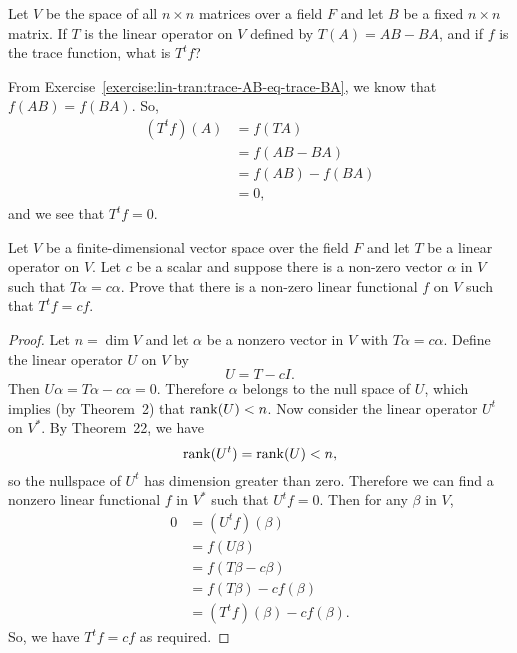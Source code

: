  Let $V$ be the space of all $n\times n$ matrices over a
field $F$ and let $B$ be a fixed $n\times n$ matrix. If $T$ is the
linear operator on $V$ defined by $T(A) = AB - BA$, and if $f$ is the
trace function, what is $T^tf$?
\begin{solution}
  From Exercise~\ref{exercise:lin-tran:trace-AB-eq-trace-BA}, we know
  that $f(AB) = f(BA)$. So,
  \begin{align*}
    (T^tf)(A)
    &= f(TA) \\
    &= f(AB - BA) \\
    &= f(AB) - f(BA) \\
    &= 0,
  \end{align*}
  and we see that $T^tf = 0$.
\end{solution}

 Let $V$ be a finite-dimensional vector space over the field
$F$ and let $T$ be a linear operator on $V$. Let $c$ be a scalar and
suppose there is a non-zero vector $\alpha$ in $V$ such that
$T\alpha = c\alpha$. Prove that there is a non-zero linear functional
$f$ on $V$ such that $T^tf = cf$.
\begin{proof}
  Let $n = \dim V$ and let $\alpha$ be a nonzero vector in $V$ with
  $T\alpha = c\alpha$. Define the linear operator $U$ on $V$ by
  \begin{equation*}
    U = T - cI.
  \end{equation*}
  Then $U\alpha = T\alpha - c\alpha = 0$. Therefore $\alpha$ belongs
  to the null space of $U$, which implies (by Theorem~2) that
  $\operatorname{rank}(U) < n$. Now consider the linear operator $U^t$ on $V^*$. By
  Theorem~22, we have
  \begin{equation*}
    \operatorname{rank}(U^t) = \operatorname{rank}(U) < n,
  \end{equation*}
  so the nullspace of $U^t$ has dimension greater than zero. Therefore
  we can find a nonzero linear functional $f$ in $V^*$ such that
  $U^tf = 0$. Then for any $\beta$ in $V$,
  \begin{align*}
    0
    &= (U^tf)(\beta) \\
    &= f(U\beta) \\
    &= f(T\beta - c\beta) \\
    &= f(T\beta) - cf(\beta) \\
    &= (T^tf)(\beta) - cf(\beta).
  \end{align*}
  So, we have $T^tf = cf$ as required.
\end{proof}

